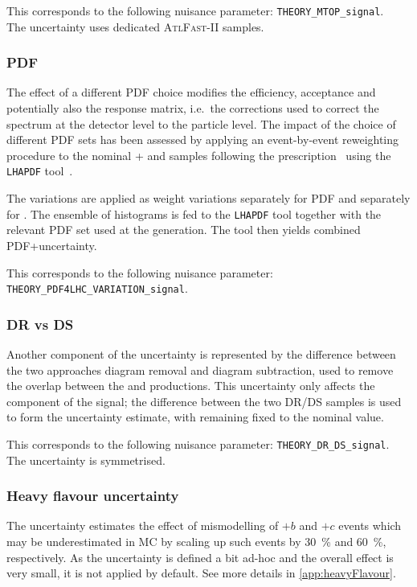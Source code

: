 This corresponds to the following nuisance parameter: \texttt{THEORY\_MTOP\_signal}.
\\The uncertainty uses dedicated \textsc{AtlFast-II} samples.

\subsubsection{PDF}%
\label{sec:systematics:pdf}
The effect of a different PDF choice modifies the efficiency, acceptance and
potentially also the response matrix, i.e.\ the corrections used to correct
the spectrum at the detector level to the particle level. 
The impact of the choice of different PDF sets has been assessed by applying
an event-by-event reweighting procedure to the nominal \POWHEG{}+
\ttbar and \tW samples following the \PDFforLHC[15] prescription~\cite{Butterworth:2015oua}
using the \texttt{LHAPDF} tool~\cite{Buckley:2014ana}.

The variations are applied as weight variations separately for PDF and separately for \alphas.
The ensemble of histograms is fed to the \texttt{LHAPDF} tool together with the relevant
PDF set used at the generation. The tool then yields combined PDF+\alphas uncertainty.

This corresponds to the following nuisance parameter: \texttt{THEORY\_PDF4LHC\_VARIATION\_signal}.

\subsubsection{\tW DR vs DS}%
\label{sec:systematics:DRvsDS}
Another component of the uncertainty is represented by the difference between
the two approaches diagram removal and diagram subtraction, used to remove
the overlap between the \ttbar and \tW productions. This uncertainty only
affects the \tW component of the signal; the difference between the two
\tW DR/DS samples is used to form the uncertainty estimate, with \ttbar
remaining fixed to the nominal value.

This corresponds to the following nuisance parameter: \texttt{THEORY\_DR\_DS\_signal}.
\\The uncertainty is symmetrised.

\subsubsection{Heavy flavour uncertainty}
The uncertainty estimates the effect of mismodelling of \ttbar \(+ b\) and
\ttbar \(+ c\) events which may be underestimated in MC by scaling up
such events by \qty{30}{\%} and \qty{60}{\%}, respectively.
As the uncertainty is defined a bit ad-hoc and the overall effect is
very small, it is not applied by default.
See more details in \cref{app:heavyFlavour}.

